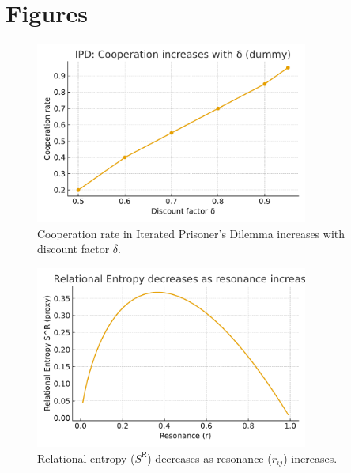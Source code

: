 
\section*{Figures}

\begin{figure}[h]
    \centering
    \includegraphics[width=0.8\textwidth]{ipd_chart.pdf}
    \caption{Cooperation rate in Iterated Prisoner's Dilemma increases with discount factor $\delta$.}
    \label{fig:ipd}
\end{figure}

\begin{figure}[h]
    \centering
    \includegraphics[width=0.8\textwidth]{entropy_chart.pdf}
    \caption{Relational entropy ($S^{\mathsf{R}}$) decreases as resonance ($r_{ij}$) increases.}
    \label{fig:entropy}
\end{figure}
